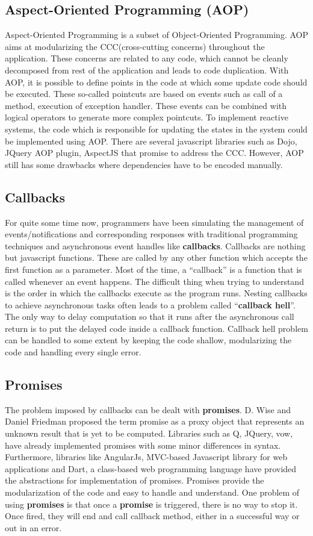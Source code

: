 \subsection{Aspect-Oriented Programming (AOP)}
Aspect-Oriented Programming is a subset of Object-Oriented Programming. 
AOP aims at modularizing the CCC(cross-cutting concerns) throughout the application. 
These concerns are related to any code, which cannot be cleanly decomposed from rest of the application and leads to code duplication. 
With AOP, it is possible to define points in the code at which some update code should be executed. 
These so-called pointcuts are based on events such as call of a method, execution of exception handler. 
These events can be combined with logical operators to generate more complex pointcuts. 
To implement reactive systems, the code which is responsible for updating the states in the system could be implemented using AOP. There are several javascript libraries such as Dojo, JQuery AOP plugin, AspectJS that promise to address the CCC. 
However, AOP still has some drawbacks where dependencies have to be encoded manually.
\subsection{Callbacks}
For quite some time now, programmers have been simulating the management of events/notifications and corresponding responses with traditional programming techniques and asynchronous event handles like \textbf{callbacks}. 
Callbacks are nothing but javascript functions. 
These are called by any other function which accepts the first function as a parameter. 
Most of the time, a ``callback'' is a function that is called whenever an event happens. 
The difficult thing when trying to understand is the order in which the callbacks execute as the program runs. 
Nesting callbacks to achieve asynchronous tasks often leads to a problem called ``\textbf{callback hell}''\cite{callbackHell}. 
The only way to delay computation so that it runs after the asynchronous call return is to put the delayed code inside a callback function.
Callback hell problem can be handled to some extent by keeping the code shallow, modularizing the code and handling every single error. 

\subsection{Promises}
The problem imposed by callbacks can be dealt with \textbf{promises}. D. Wise and Daniel Friedman\cite{promiseKeyword} proposed the term promise as a proxy object that represents an unknown result that is yet to be computed. 
Libraries such as Q, JQuery, vow, have already implemented promises with some minor differences in syntax.
Furthermore, libraries like AngularJs\cite{angularjs}, MVC-based Javascript library for web applications and Dart, a class-based web programming language have provided the abstractions for implementation of promises. 
Promises provide the modularization of the code and easy to handle and understand. 
One problem of using \textbf{promises} is that once a \textbf{promise} is triggered, there is no way to stop it. 
Once fired, they will end and call callback method, either in a successful way or out in an error.


